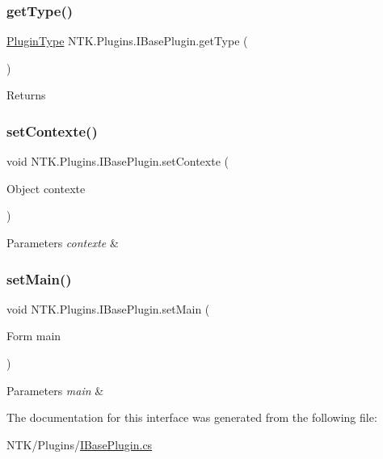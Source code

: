 \subsubsection{\texorpdfstring{getType()}{getType()}}
{\footnotesize\ttfamily \mbox{\hyperlink{namespace_n_t_k_1_1_plugins_a28446e981e24d29d7c9c23b245f6987b}{Plugin\+Type}} N\+T\+K.\+Plugins.\+I\+Base\+Plugin.\+get\+Type (\begin{DoxyParamCaption}{ }\end{DoxyParamCaption})}





\begin{DoxyReturn}{Returns}

\end{DoxyReturn}
\mbox{\label{interface_n_t_k_1_1_plugins_1_1_i_base_plugin_aa24f2762da939495314b854c3b1dcff0}} 
\subsubsection{\texorpdfstring{setContexte()}{setContexte()}}
{\footnotesize\ttfamily void N\+T\+K.\+Plugins.\+I\+Base\+Plugin.\+set\+Contexte (\begin{DoxyParamCaption}\item[{Object}]{contexte }\end{DoxyParamCaption})}






\begin{DoxyParams}{Parameters}
{\em contexte} & \\
\hline
\end{DoxyParams}
\mbox{\label{interface_n_t_k_1_1_plugins_1_1_i_base_plugin_a3b1ceaa581149665ee9cf15d4b4fd932}} 
\subsubsection{\texorpdfstring{setMain()}{setMain()}}
{\footnotesize\ttfamily void N\+T\+K.\+Plugins.\+I\+Base\+Plugin.\+set\+Main (\begin{DoxyParamCaption}\item[{Form}]{main }\end{DoxyParamCaption})}






\begin{DoxyParams}{Parameters}
{\em main} & \\
\hline
\end{DoxyParams}


The documentation for this interface was generated from the following file\+:\begin{DoxyCompactItemize}
\item 
N\+T\+K/\+Plugins/\mbox{\hyperlink{_i_base_plugin_8cs}{I\+Base\+Plugin.\+cs}}\end{DoxyCompactItemize}
